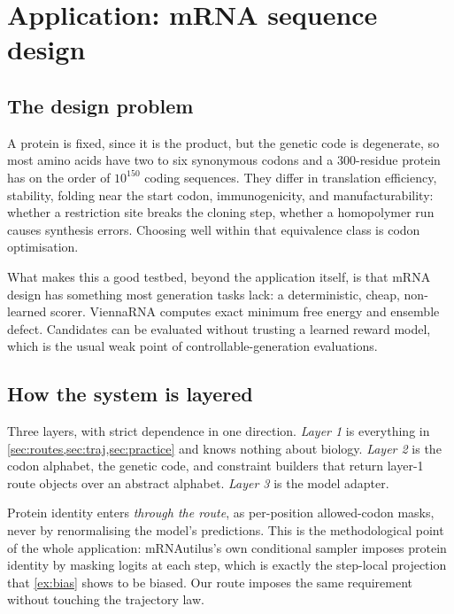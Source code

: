 \documentclass[11pt]{article}
\theoremstyle{definition}
\begin{document}
\section{Application: mRNA sequence design}\label{sec:mrna}

\subsection{The design problem}
A protein is fixed, since it is the product, but the genetic code is degenerate, so most amino acids have two to
six synonymous codons and a 300-residue protein has on the order of $10^{150}$ coding sequences. They differ in
translation efficiency, stability, folding near the start codon, immunogenicity, and manufacturability: whether a
restriction site breaks the cloning step, whether a homopolymer run causes synthesis errors. Choosing well within
that equivalence class is codon optimisation.

What makes this a good testbed, beyond the application itself, is that mRNA design has something most generation
tasks lack: a deterministic, cheap, non-learned scorer. ViennaRNA computes exact minimum free energy and ensemble
defect. Candidates can be evaluated without trusting a learned reward model, which is the usual weak point of
controllable-generation evaluations.

\subsection{How the system is layered}
Three layers, with strict dependence in one direction. \emph{Layer 1} is everything in
\cref{sec:routes,sec:traj,sec:practice} and knows nothing about biology. \emph{Layer 2} is the codon alphabet,
the genetic code, and constraint builders that return layer-1 route objects over an abstract alphabet.
\emph{Layer 3} is the model adapter.

Protein identity enters \emph{through the route}, as per-position allowed-codon masks, never by renormalising the
model's predictions. This is the methodological point of the whole application: mRNAutilus's own conditional
sampler imposes protein identity by masking logits at each step, which is exactly the step-local projection that
\cref{ex:bias} shows to be biased. Our route imposes the same requirement without touching the trajectory law.
\end{document}

